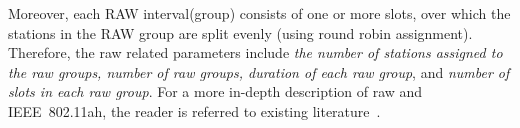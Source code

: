 Moreover, each RAW interval(group) consists of one or more slots, over which the stations in the RAW group are split evenly (using round robin assignment). Therefore, the \gls{raw} related parameters include \textit{ the number of stations assigned to the \gls{raw} groups, number of \gls{raw} groups, duration of each \gls{raw} group}, and  \textit{number of slots in each \gls{raw} group}. For a more in-depth description of \gls{raw} and IEEE~802.11ah, the reader is referred to existing literature~\cite{80211ahStd, Khorov2015a, sensors80211ah}.



